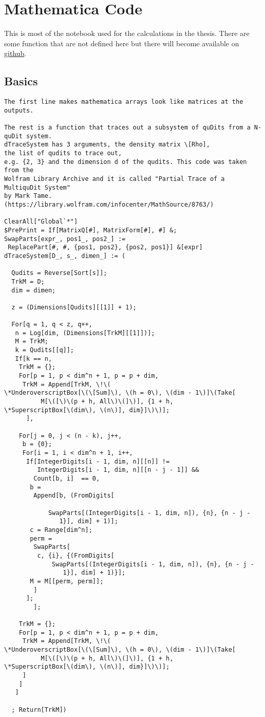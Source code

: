 \appendix
\chapter{Mathematica Code}
This is most of the notebook used for the calculations in the thesis. There are some function that are not defined here but there will become available on \href{https://github.com/jmstf94}{github}.
\label{appendix:code}
\section{Basics}
\begin{verbatim}
The first line makes mathematica arrays look like matrices at the outputs. 

The rest is a function that traces out a subsystem of quDits from a N-quDit system.
dTraceSystem has 3 arguments, the density matrix \[Rho], 
the list of qudits to trace out, 
e.g. {2, 3} and the dimension d of the qudits. This code was taken from the 
Wolfram Library Archive and it is called "Partial Trace of a MultiquDit System" 
by Mark Tame.
(https://library.wolfram.com/infocenter/MathSource/8763/)

ClearAll["Global`*"]
$PrePrint = If[MatrixQ[#], MatrixForm[#], #] &;
SwapParts[expr_, pos1_, pos2_] := 
 ReplacePart[#, #, {pos1, pos2}, {pos2, pos1}] &[expr]
dTraceSystem[D_, s_, dimen_] := (
  
  Qudits = Reverse[Sort[s]];
  TrkM = D;
  dim = dimen;
  
  z = (Dimensions[Qudits][[1]] + 1);
  
  For[q = 1, q < z, q++,
   n = Log[dim, (Dimensions[TrkM][[1]])];
   M = TrkM;
   k = Qudits[[q]];
   If[k == n,
    TrkM = {};
    For[p = 1, p < dim^n + 1, p = p + dim,
     TrkM = Append[TrkM, \!\(
\*UnderoverscriptBox[\(\[Sum]\), \(h = 0\), \(dim - 1\)]\(Take[
          M[\([\)\(p + h, All\)\(]\)], {1 + h, 
\*SuperscriptBox[\(dim\), \(n\)], dim}]\)\)];
      ],
    
    For[j = 0, j < (n - k), j++,
     b = {0};
     For[i = 1, i < dim^n + 1, i++,
      If[IntegerDigits[i - 1, dim, n][[n]] != 
         IntegerDigits[i - 1, dim, n][[n - j - 1]] && 
        Count[b, i]  == 0, 
       b = 
        Append[b, (FromDigits[
            
            SwapParts[(IntegerDigits[i - 1, dim, n]), {n}, {n - j - 
               1}], dim] + 1)];
       c = Range[dim^n];
       perm = 
        SwapParts[
         c, {i}, {(FromDigits[
             SwapParts[(IntegerDigits[i - 1, dim, n]), {n}, {n - j - 
                1}], dim] + 1)}];
       M = M[[perm, perm]];
        ]    
      ];
        ];
    
    TrkM = {};
    For[p = 1, p < dim^n + 1, p = p + dim,
     TrkM = Append[TrkM, \!\(
\*UnderoverscriptBox[\(\[Sum]\), \(h = 0\), \(dim - 1\)]\(Take[
          M[\([\)\(p + h, All\)\(]\)], {1 + h, 
\*SuperscriptBox[\(dim\), \(n\)], dim}]\)\)];
     ]
    ]
   ]
  
  ; Return[TrkM])
\end{verbatim}
